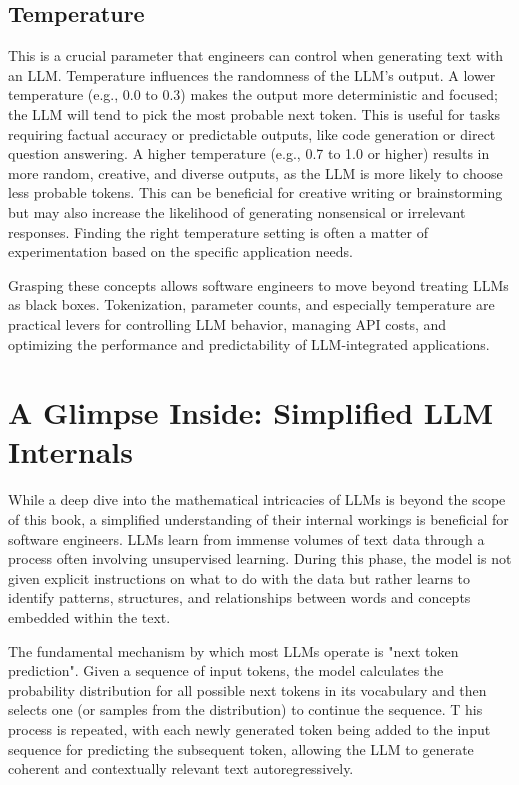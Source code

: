 \subsection*{Temperature}
This is a crucial parameter that engineers can control when generating text with an LLM. Temperature influences the randomness of the LLM's output. 
A lower temperature (e.g., 0.0 to 0.3) makes the output more deterministic and focused; the LLM will tend to pick the most probable next token. 
This is useful for tasks requiring factual accuracy or predictable outputs, like code generation or direct question answering. 
A higher temperature (e.g., 0.7 to 1.0 or higher) results in more random, creative, and diverse outputs, as the LLM is more likely to choose less probable tokens. 
This can be beneficial for creative writing or brainstorming but may also increase the likelihood of generating nonsensical or irrelevant responses. 
Finding the right temperature setting is often a matter of experimentation based on the specific application needs.

Grasping these concepts allows software engineers to move beyond treating LLMs as black boxes. Tokenization, parameter counts, and especially temperature 
are practical levers for controlling LLM behavior, managing API costs, and optimizing the performance and predictability of LLM-integrated applications.

\section{A Glimpse Inside: Simplified LLM Internals}

While a deep dive into the mathematical intricacies of LLMs is beyond the scope of this book, a simplified understanding of their internal workings is 
beneficial for software engineers. LLMs learn from immense volumes of text data through a process often involving unsupervised learning. 
During this phase, the model is not given explicit instructions on what to do with the data but rather learns to identify patterns, structures, and 
relationships between words and concepts embedded within the text.

The fundamental mechanism by which most LLMs operate is "next token prediction". Given a sequence of input tokens, the model calculates the probability 
distribution for all possible next tokens in its vocabulary and then selects one (or samples from the distribution) to continue the sequence. T
his process is repeated, with each newly generated token being added to the input sequence for predicting the subsequent token, allowing the LLM to 
generate coherent and contextually relevant text autoregressively.

